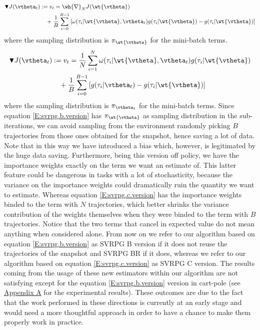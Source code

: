 \begin{align}\label{E:svrpg.b.version}
	\blacktriangledown J(\vtheta_{t}) &:= v_t= \wh{\nabla}_N J(\wt{\vtheta})\\ \notag
	& \quad{} + 
		\frac{1}{B} \sum_{i=0}^{B-1} \left[
		\omega(\tau_i|\wt{\vtheta}, \vtheta_t)g(\tau_i|\wt{\vtheta}) - g(\tau_i|\wt{\vtheta})
		\right]
\end{align}
where the sampling distribution is $\pi_{\wt{\vtheta}}$ for the mini-batch terms.
\begin{align}\label{E:svrpg.c.version}
	\blacktriangledown J(\vtheta_{t}) &:= v_t= \frac{1}{N}\sum_{i=1}^{N} \omega(\tau_i|\wt{\vtheta}, \vtheta_t)g(\tau_i|\wt{\vtheta})\\\notag & \quad{} + 
		\frac{1}{B} \sum_{i=0}^{B-1} \left[
		g(\tau_i|\vtheta_t) - g(\tau_i|\wt{\vtheta})
		\right]
\end{align}
where the sampling distribution is $\pi_{\vtheta_t}$ for the mini-batch terms.\newline
Since equation \ref{E:svrpg.b.version} has $\pi_{\wt{\vtheta}}$ as sampling distribution in the sub-iterations, we can avoid sampling from the environment randomly picking $B$ trajectories from those ones obtained for the snapshot, hence saving a lot of data. Note that in this way we have introduced a bias which, however, is legitimated by the huge data saving. Furthermore, being this version off policy, we have the importance weights exactly on the term we want an estimate of. This latter feature could be dangerous in tasks with a lot of stochasticity, because the variance on the importance weights could dramatically ruin the quantity we want to estimate. Whereas equation \ref{E:svrpg.c.version} has the importance weights binded to the term with $N$ trajectories, which better shrinks the variance contribution of the weights themselves \wrt when they were binded to the term with $B$ trajectories. Notice that the two terms that cancel in expected value do not mean anything when considered alone. From now on we refer to our algorithm based on equation \ref{E:svrpg.b.version} as \acs{SVRPG} B version if it does not reuse the trajectories of the snapshot and \acs{SVRPG} BR if it does, whereas we refer to our algorithm based on equation \ref{E:svrpg.c.version} as \acs{SVRPG} C version.\newline
The results coming from the usage of these new estimators within our algorithm are not satisfying except for the equation \ref{E:svrpg.b.version} version in cart-pole (see \hyperref[chap:appendix]{Appendix A} for the experimental results). These outcomes are due to the fact that the work performed in these directions is currently at an early stage and would need a more thoughtful approach in order to have a chance to make them properly work in practice.

\vspace{-0.05in}